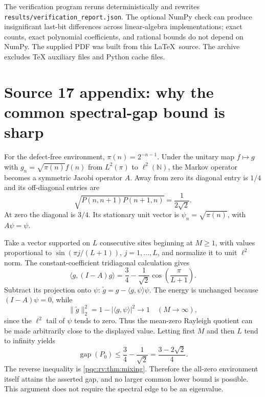 \documentclass[11pt,letterpaper]{article}
\numberwithin{equation}{section}
\theoremstyle{definition}
\theoremstyle{remark}
\newcommand{\N}{\mathbb N}
\newcommand{\gap}{\operatorname{gap}}
\begin{document}
The verification program reruns deterministically and rewrites
\texttt{results/verification\_report.json}. The optional NumPy check can
produce insignificant last-bit differences across linear-algebra
implementations; exact counts, exact polynomial coefficients, and rational
bounds do not depend on NumPy. The supplied PDF was built from this
\LaTeX\ source. The archive excludes TeX auxiliary files and Python cache
files.

\section{Source 17 appendix: why the common spectral-gap bound is sharp}
\label{pqc:rv:app:sharp}
For the defect-free environment, $\pi(n)=2^{-n-1}$. Under the unitary
map $f\mapsto g$ with $g_n=\sqrt{\pi(n)}f(n)$ from $L^2(\pi)$
to $\ell^2(\N)$, the Markov operator becomes a symmetric Jacobi
operator $A$. Away from zero its diagonal entry is $1/4$ and its
off-diagonal entries are
\[
 \sqrt{P(n,n+1)P(n+1,n)}=\frac1{2\sqrt2}.
\]
At zero the diagonal is $3/4$. Its stationary unit vector is
$\psi_n=\sqrt{\pi(n)}$, with $A\psi=\psi$.

Take a vector supported on $L$ consecutive sites beginning at
$M\geq1$, with values proportional to
$\sin(\pi j/(L+1))$, $j=1,\ldots,L$, and normalize it to unit
$\ell^2$ norm. The constant-coefficient tridiagonal calculation gives
\[
 \langle g,(I-A)g\rangle
 =\frac34-\frac1{\sqrt2}\cos\left(\frac\pi{L+1}\right).
\]
Subtract its projection onto $\psi$:
$\widetilde g=g-\langle g,\psi\rangle\psi$.
The energy is unchanged because $(I-A)\psi=0$, while
\[
 \|\widetilde g\|_2^2
 =1-|\langle g,\psi\rangle|^2\longrightarrow1
 \quad(M\to\infty),
\]
since the $\ell^2$ tail of $\psi$ tends to zero. Thus the mean-zero
Rayleigh quotient can be made arbitrarily close to the displayed
value. Letting first $M$ and then $L$ tend to infinity yields
\[
 \gap(P_0)\leq\frac34-\frac1{\sqrt2}
 =\frac{3-2\sqrt2}{4}.
\]
The reverse inequality is \cref{pqc:rv:thm:mixing}. Therefore the all-zero
environment itself attains the asserted gap, and no larger common
lower bound is possible. This argument does not require the spectral
edge to be an eigenvalue.
\end{document}
